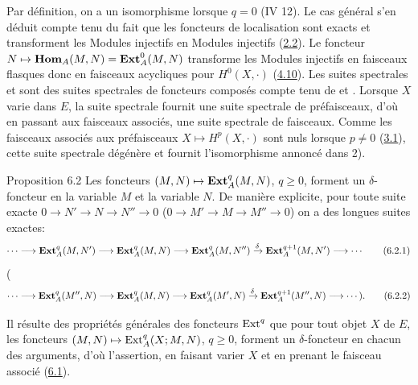 \documentclass[10pt]{../fichiers-configuration-latex/smfart}
\begin{document}
Par définition, on a un isomorphisme  lorsque $q = 0$ (IV
12). Le cas général s'en déduit compte tenu du fait que les
foncteurs de localisation sont exacts et transforment les Modules
injectifs en Modules injectifs (\hyperref[V.subsec2.2]{2.2}). Le foncteur $N \mapsto
\operatorname{\mathbf{Hom}}_A(M, N) = \operatorname{\mathbf{Ext}}^0_A(M, N)$ transforme les Modules
injectifs en faisceaux flasques donc en faisceaux acycliques pour
$H^{0}(X, ⋅)$ (\hyperref[V.prop4.10]{4.10}). Les suites spectrales  et 
sont des suites spectrales de foncteurs composés compte tenu de
 et . Lorsque $X$ varie dans $E$, la suite spectrale
 fournit une suite spectrale de préfaisceaux, d'où en
passant aux faisceaux associés, une suite spectrale de
faisceaux. Comme les faisceaux associés aux préfaisceaux $X
\mapsto H^p(X, ⋅)$ sont nuls lorsque $p \neq 0$ (\hyperref[V.prop3.1]{3.1}), cette suite
spectrale dégénère et fournit l'isomorphisme annoncé dans 2).

\begin{enonce*}{Proposition 6.2}
Les foncteurs $(M, N) \mapsto \operatorname{\mathbf{Ext}}^q_A(M, N)$, $q \geq 0$, forment un
$\delta$-foncteur en la variable $M$ et la variable $N$. De manière
explicite, pour toute suite exacte $0 \to N' \to N \to N'' \to 0$
(\resp $0 \to M' \to M \to M'' \to 0$) on a des longues suites exactes:
\begin{equation*}
\cdots \to \Eext^q_A(M, N') \to \Eext^q_A(M, N) \to \Eext^q_A(M, N'')
\xrightarrow{\delta}\Eext^{q+1}_A(M, N') \to \cdots \tag{6.2.1}
\end{equation*}
 (\resp
\begin{equation*}
\cdots \to \Eext^q_A(M'', N) \to \Eext^q_A(M, N) \to \Eext^q_A(M', N)
\xrightarrow{\delta}\Eext^{q+1}_A(M'', N) \to \cdots ){\quoi}.\tag{6.2.2}
\end{equation*}
\end{enonce*}

Il résulte des propriétés générales des foncteurs $\operatorname{Ext}^q$ que pour
tout objet $X$ de $E$, les foncteurs $(M, N) \mapsto \operatorname{Ext}^q_A(X;M,
N)$, $q \geq 0$, forment un $\delta$-foncteur en chacun des
arguments, d'où l'assertion, en faisant varier $X$ et en prenant
le faisceau associé (\hyperref[V.prop6.1]{6.1}).

\setcounter{subsection}{2}
\end{document}
